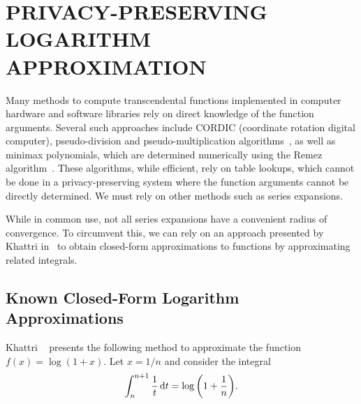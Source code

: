 \chapter{PRIVACY-PRESERVING LOGARITHM APPROXIMATION}
\label{chap:logarithm_approximation}
Many methods to compute transcendental functions implemented in computer hardware and software libraries rely on direct knowledge of the function arguments. Several such approaches include CORDIC (coordinate rotation digital computer), pseudo-division and pseudo-multiplication algorithms~\cite{walther_cordic_2000}, as well as minimax polynomials, which are determined numerically using the Remez algorithm~\cite{harrison_computation_1999}. These algorithms, while efficient, rely on table lookups, which cannot be done in a privacy-preserving system where the function arguments cannot be directly determined. We must rely on other methods such as series expansions.

While in common use, not all series expansions have a convenient radius of convergence. To circumvent this, we can rely on an approach presented by Khattri in~\cite{khattri_new_2009} to obtain closed-form approximations to functions by approximating related integrals.

\section{Known Closed-Form Logarithm Approximations}
Khattri ~\cite{khattri_new_2009} presents the following method to approximate the function $f(x)=\log\left(1+x\right)$.
Let $x = 1/n$ and consider the integral
\begin{align}
	\label{eq:log_integral}
	\int_{n}^{n+1}{\frac{1}{t}\mathop{}\!\mathrm{d} t}=\log{\left(1+\frac{1}{n}\right)}.
\end{align}


